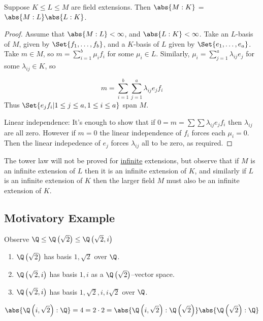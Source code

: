 \documentclass{article}
\begin{document}
\begin{nthm}
    Suppose $K \leq L \leq M$ are field extensions. Then $\abs{M:K}$ = $\abs{M:L}\abs{L:K}$.
\end{nthm}
\begin{proof}
    Assume that $\abs{M:L} < \infty$, and $\abs{L:K} < \infty$.
    Take an $L$-basis of $M$, given by $\Set{f_1, \dotsc, f_b}$, and a $K$-basis of $L$ given by $\Set{e_1, \dotsc, e_a}$.
    Take $m \in M$, so $m = \sum_{i=1}^b \mu_i f_i$ for some $\mu_i \in L$.
    Similarly, $\mu_i = \sum_{j=1}^a \lambda_{ij} e_j$ for some $\lambda_{ij} \in K$, so

    \begin{equation*}
        m = \sum_{i=1}^b \sum_{j=1}^a \lambda_{ij} e_j f_i
    \end{equation*}
    Thus $\Set{e_j f_i | 1 \leq j \leq a, 1 \leq i \leq a}$ span $M$.

    Linear independence:
    It's enough to show that if $0 = m = \sum \sum \lambda_{ij} e_j f_i$ then $\lambda_{ij}$ are all zero.
    However if $m = 0$ the linear independence of $f_i$ forces each $\mu_i = 0$.
    Then the linear indepedence of $e_j$ forces $\lambda_{ij}$ all to be zero, as required.
\end{proof}

The tower law will not be proved for \hyperlink{def:degreeOfFieldExt}{infinite} extensions, but observe that if $M$ is an infinite extension of $L$ then it is an infinite extension of $K$, and similarly if $L$ is an infinite extension of $K$ then the larger field $M$ must also be an infinite extension of $K$.

\subsection{Motivatory Example}
Observe $\Q \leq \Q\left(\sqrt{2}\right) \leq \Q\left(\sqrt{2}, i\right)$
\begin{enumerate}[label=(\roman*)]
    \item $\Q\left(\sqrt{2}\right)$ has basis $1, \sqrt{2}$ over $\Q$.
    \item $\Q\left(\sqrt{2}, i\right)$ has basis $1, i$ as a $\Q\left(\sqrt{2}\right)$--vector space.
    \item $\Q\left(\sqrt{2}, i\right)$ has basis $1, \sqrt{2}, i, i\sqrt{2}$ over $\Q$.
\end{enumerate}
\begin{equation*}
    \abs{\Q\left(i, \sqrt{2}\right):\Q} = 4 = 2 \cdot 2 = \abs{\Q\left(i, \sqrt{2}\right) : \Q\left(\sqrt{2}\right)} \abs{\Q\left(\sqrt{2}\right):\Q}
\end{equation*}
\end{document}
